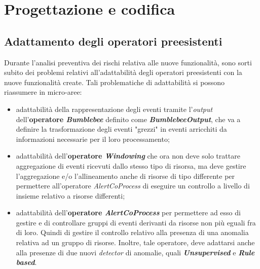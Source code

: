 
\chapter{Progettazione e codifica}
\label{cap:progettazione-codifica}


\section{Adattamento degli operatori preesistenti}
Durante l'analisi preventiva dei rischi relativa alle nuove funzionalità, sono sorti subito dei problemi relativi all'adattabilità degli operatori preesistenti con la nuove funzionalità create. Tali problematiche di adattabilità si possono riassumere in micro-aree:

\begin{itemize}
	\item{adattabilità della rappresentazione degli eventi tramite l'\textit{output} dell'\textbf{operatore \textit{Bumblebee}} definito come \textbf{\textit{BumblebeeOutput}}, che va a definire la trasformazione degli eventi "grezzi" in eventi arricchiti da informazioni necessarie per il loro processamento;}
	\item{adattabilità dell'\textbf{operatore \textit{Windowing}} che ora non deve solo trattare aggregazione di eventi ricevuti dallo stesso tipo di risorsa, ma deve gestire l'aggregazione e/o l'allineamento anche di risorse di tipo differente per permettere all'operatore \textit{AlertCoProcess} di eseguire un controllo a livello di insieme relativo a risorse differenti;}
	\item{adattabilità dell'\textbf{operatore \textit{AlertCoProcess}} per permettere ad esso di gestire e di controllare gruppi di eventi derivanti da risorse non più eguali fra di loro. Quindi di gestire il controllo relativo alla presenza di una anomalia relativa ad un gruppo di risorse. Inoltre, tale operatore, deve adattarsi anche alla presenze di due nuovi \textit{detector} di anomalie, quali \textbf{\textit{Unsupervised}} e \textbf{\textit{Rule based}}.}
\end{itemize}
	
